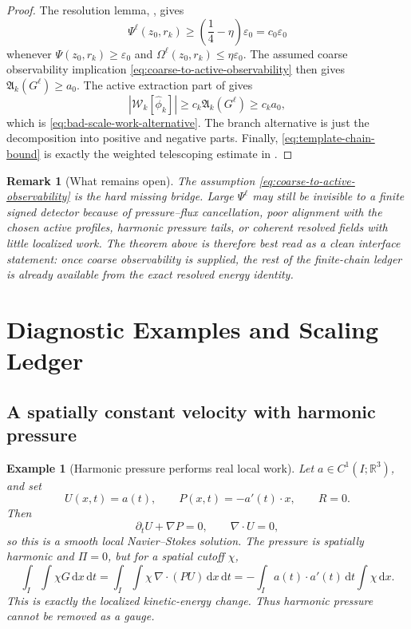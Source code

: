 \documentclass[11pt]{article}
\numberwithin{equation}{section}
\newtheorem{remark}[theorem]{Remark}
\newtheorem{example}[theorem]{Example}
\newcommand{\R}{\mathbb R}
\newcommand{\eps}{\varepsilon}
\newcommand{\dx}{\,\mathrm dx}
\newcommand{\dt}{\,\mathrm dt}
\newcommand{\dxdt}{\,\mathrm dx\,\mathrm dt}
\newcommand{\W}{\mathcal W}
\newcommand{\Aact}{\mathfrak A}
\begin{document}
\begin{proof}
The resolution lemma, , gives
\[
\Psi^\ell(z_0,r_k)\ge \left(\frac14-\eta\right)\eps_0=c_0\eps_0
\]
whenever \(\Psi(z_0,r_k)\ge\eps_0\) and \(\Omega^\ell(z_0,r_k)\le\eta\eps_0\).  The assumed coarse observability implication \eqref{eq:coarse-to-active-observability} then gives \(\Aact_k(G^\ell)\ge a_0\).  The active extraction part of  gives
\[
|\W_k[\widehat\phi_k]|\ge c_k\Aact_k(G^\ell)\ge c_k a_0,
\]
which is \eqref{eq:bad-scale-work-alternative}.  The branch alternative is just the decomposition into positive and negative parts.  Finally, \eqref{eq:template-chain-bound} is exactly the weighted telescoping estimate in .
\end{proof}

\begin{remark}[What remains open]
The assumption \eqref{eq:coarse-to-active-observability} is the hard missing bridge.  Large \(\Psi^\ell\) may still be invisible to a finite signed detector because of pressure--flux cancellation, poor alignment with the chosen active profiles, harmonic pressure tails, or coherent resolved fields with little localized work.  The theorem above is therefore best read as a clean interface statement: once coarse observability is supplied, the rest of the finite-chain ledger is already available from the exact resolved energy identity.
\end{remark}

\section{Diagnostic Examples and Scaling Ledger}\label{sec:diagnostics}

\subsection{A spatially constant velocity with harmonic pressure}

\begin{example}[Harmonic pressure performs real local work]\label{ex:harmonic-pressure}
Let \(a\in C^1(I;\R^3)\), and set
\[
U(x,t)=a(t),
\qquad
P(x,t)=-a'(t)\cdot x,
\qquad
R=0.
\]
Then
\[
\partial_tU+\nabla P=0,
\qquad
\nabla\cdot U=0,
\]
so this is a smooth local Navier--Stokes solution. The pressure is spatially harmonic and \(\Pi=0\), but for a spatial cutoff \(\chi\),
\[
\int_I\int\chi G\dxdt
=
\int_I\int\chi\,\nabla\cdot(PU)\dxdt
=
-\int_I a(t)\cdot a'(t)\dt\int\chi\dx.
\]
This is exactly the localized kinetic-energy change. Thus harmonic pressure cannot be removed as a gauge.
\end{example}
\end{document}
